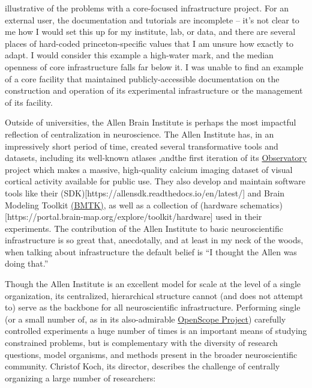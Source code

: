\documentclass[nohyper]{tufte-book-jls}
\begin{document}
illustrative of the problems with a core-focused infrastructure project.
For an external user, the documentation and tutorials are incomplete --
it's not clear to me how I would set this up for my institute, lab, or
data, and there are several places of hard-coded princeton-specific
values that I am unsure how exactly to adapt. I would
consider this example a high-water mark, and the median openness of core
infrastructure falls far below it. I was unable to find an example of a
core facility that maintained publicly-accessible documentation on the
construction and operation of its experimental infrastructure or the
management of its facility.

Outside of universities, the Allen Brain Institute is perhaps the most
impactful reflection of centralization in neuroscience. The Allen
Institute has, in an impressively short period of time, created several
transformative tools and datasets, including its well-known atlases \cite{leinGenomewideAtlasGene2007},andthe first iteration of its
\href{http://observatory.brain-map.org/}{Observatory} project which
makes a massive, high-quality calcium imaging dataset of visual cortical
activity available for public use. They also develop and maintain
software tools like their
(SDK){[}https://allensdk.readthedocs.io/en/latest/{]} and Brain Modeling
Toolkit \href{https://alleninstitute.github.io/bmtk/}{(BMTK)}, as well
as a collection of (hardware
schematics){[}https://portal.brain-map.org/explore/toolkit/hardware{]}
used in their experiments. The contribution of the Allen Institute to
basic neuroscientific infrastructure is so great that, anecdotally, and
at least in my neck of the woods, when talking about infrastructure the
default belief is ``I thought the Allen was doing that.''

Though the Allen Institute is an excellent model for scale at the level
of a single organization, its centralized, hierarchical structure cannot
(and does not attempt to) serve as the backbone for all neuroscientific
infrastructure. Performing single (or a small number of, as in its
also-admirable
\href{https://alleninstitute.org/what-we-do/brain-science/news-press/articles/three-collaborative-studies-launch-openscope-shared-observatory-neuroscience}{OpenScope
Project}) carefully controlled experiments a huge number of times is an
important means of studying constrained problems, but is complementary
with the diversity of research questions, model organisms, and methods
present in the broader neuroscientific community. Christof Koch, its
director, describes the challenge of centrally organizing a large number
of researchers:
\end{document}

